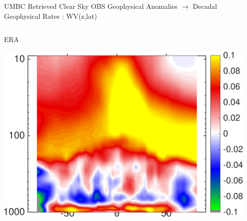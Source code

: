 \documentclass[10pt,t]{beamer}
\begin{document}
\begin{frame}{UMBC Retrieved Clear Sky OBS Geophysical Anomalies $\rightarrow$ Decadal Geophysical Rates : WV(z,lat)}
\vspace{-0.35in}

\begin{columns}
\begin{column}{0.45\columnwidth}
\begin{block}{\footnotesize ERA}
\vspace{-0.1in}
\begin{center}
\includegraphics[width=\linewidth]{Figs/ClearAnom/rawERAwvrates.png}
\end{center}
\end{block}
\end{column}

\begin{column}{0.45\columnwidth}
\end{column}
\end{columns}

\vspace{-0.25in}


\end{frame}
\end{document}
